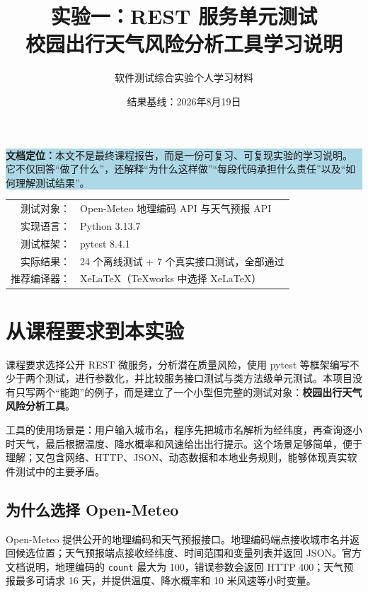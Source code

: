 \documentclass[UTF8,zihao=-4,a4paper]{ctexart}
\title{\heiti\Huge 实验一：REST 服务单元测试\\[0.7em]
\Large 校园出行天气风险分析工具学习说明}
\author{软件测试综合实验\quad 个人学习材料}
\date{结果基线：2026年8月19日}
\newcommand{\term}[1]{\textbf{#1}}
\newcommand{\code}[1]{\texttt{#1}}
\begin{document}
\maketitle
\thispagestyle{empty}

\begin{center}
\begin{minipage}{0.88\textwidth}
\colorbox{LightBlue}{\parbox{0.94\textwidth}{
\textbf{文档定位：}本文不是最终课程报告，而是一份可复习、可复现实验的学习说明。
它不仅回答“做了什么”，还解释“为什么这样做”“每段代码承担什么责任”以及“如何理解测试结果”。
}}
\end{minipage}
\end{center}

\vfill
\begin{center}
\begin{tabular}{rl}
测试对象：& Open-Meteo 地理编码 API 与天气预报 API \\
实现语言：& Python 3.13.7 \\
测试框架：& pytest 8.4.1 \\
实际结果：& 24 个离线测试 + 7 个真实接口测试，全部通过 \\
推荐编译器：& XeLaTeX（TeXworks 中选择 XeLaTeX）
\end{tabular}
\end{center}

\clearpage
\tableofcontents
\clearpage

\section{从课程要求到本实验}

课程要求选择公开 REST 微服务，分析潜在质量风险，使用 pytest 等框架编写不少于两个测试，进行参数化，并比较服务接口测试与类方法级单元测试。本项目没有只写两个“能跑”的例子，而是建立了一个小型但完整的测试对象：\term{校园出行天气风险分析工具}。

工具的使用场景是：用户输入城市名，程序先把城市名解析为经纬度，再查询逐小时天气，最后根据温度、降水概率和风速给出出行提示。这个场景足够简单，便于理解；又包含网络、HTTP、JSON、动态数据和本地业务规则，能够体现真实软件测试中的主要矛盾。

\subsection{为什么选择 Open-Meteo}

Open-Meteo 提供公开的地理编码和天气预报接口。地理编码端点接收城市名并返回候选位置；天气预报端点接收经纬度、时间范围和变量列表并返回 JSON。官方文档说明，地理编码的 \code{count} 最大为 100，错误参数会返回 HTTP 400；天气预报最多可请求 16 天，并提供温度、降水概率和 10 米风速等小时变量\cite{openmeteo-geocoding,openmeteo-forecast}。
\end{document}

